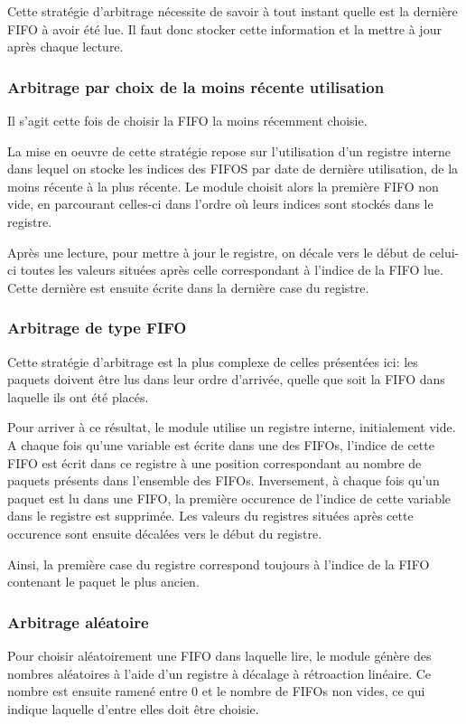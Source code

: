 Cette stratégie d'arbitrage nécessite de savoir à tout instant quelle est la dernière FIFO à avoir été lue.
Il faut donc stocker cette information et la mettre à jour après chaque lecture.

\subsubsection{Arbitrage par choix de la moins récente utilisation}
Il s'agit cette fois de choisir la FIFO la moins récemment choisie.

La mise en oeuvre de cette stratégie repose sur l'utilisation d'un registre interne
dans lequel on stocke les indices des FIFOS par date de dernière utilisation, de la moins récente à la plus récente.
Le module  choisit alors la première FIFO non vide, en parcourant celles-ci dans l'ordre où leurs indices sont stockés dans le registre.

Après une lecture, pour mettre à jour le registre, on décale vers le début de celui-ci toutes les valeurs situées après celle correspondant à l'indice de la FIFO lue.
Cette dernière est ensuite écrite dans la dernière case du registre.

\subsubsection{Arbitrage de type FIFO}
Cette stratégie d'arbitrage est la plus complexe de celles présentées ici:
les paquets doivent être lus dans leur ordre d'arrivée, quelle que soit
la FIFO dans laquelle ils ont été placés.

Pour arriver à ce résultat, le module utilise un registre interne, initialement vide.
A chaque fois qu'une variable est écrite dans une des FIFOs, l'indice de cette FIFO est écrit dans ce registre
à une position correspondant au nombre de paquets présents dans l'ensemble des FIFOs.
Inversement, à chaque fois qu'un paquet est lu dans une FIFO, la première occurence de l'indice de cette
variable dans le registre est supprimée. Les valeurs du registres situées après cette occurence sont ensuite décalées vers le début du registre.

Ainsi, la première case du registre correspond toujours à l'indice de la FIFO contenant le paquet le plus ancien.

\subsubsection{Arbitrage aléatoire}
Pour choisir aléatoirement une FIFO dans laquelle lire, le module génère des nombres aléatoires
à l'aide d'un registre à décalage à rétroaction linéaire.
Ce nombre est ensuite ramené entre 0 et le nombre de FIFOs non vides, ce qui indique laquelle d'entre elles doit être choisie.

